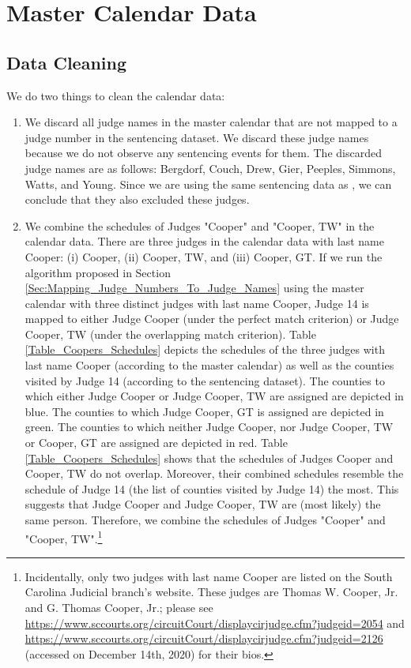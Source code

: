 \documentclass[11pt, oneside]{article}   	%
\theoremstyle{ModifiedStyle}
\begin{document}
\section{Master Calendar Data}
  \label{Appendix:Master_Calendar}
  \subsection{Data Cleaning}
    We do two things to clean the calendar data:

    \begin{enumerate}
      \item We discard all judge names in the master calendar that are not mapped to a judge number in the sentencing dataset. We discard these judge names because we do not observe any sentencing events for them. The discarded judge names are as follows: Bergdorf, Couch, Drew, Gier, Peeples, Simmons, Watts, and Young. Since we are using the same sentencing data as \cite{hester2017conditional}, we can conclude that they also excluded these judges.
    	\item We combine the schedules of Judges "Cooper" and "Cooper, TW" in the calendar data. There are three judges in the calendar data with last name Cooper: (i) Cooper, (ii) Cooper, TW, and (iii) Cooper, GT. If we run the algorithm proposed in Section \ref{Sec:Mapping_Judge_Numbers_To_Judge_Names} using the master calendar with three distinct judges with last name Cooper, Judge 14 is mapped to either Judge Cooper (under the perfect match criterion) or Judge Cooper, TW (under the overlapping match criterion). Table \ref{Table_Coopers_Schedules} depicts the schedules of the three judges with last name Cooper (according to the master calendar) as well as the counties visited by Judge 14 (according to the sentencing dataset). The counties to which either Judge Cooper or Judge Cooper, TW are assigned are depicted in blue. The counties to which Judge Cooper, GT is assigned are depicted in green. The counties to which neither Judge Cooper, nor Judge Cooper, TW or Cooper, GT are assigned are depicted in red. Table \ref{Table_Coopers_Schedules} shows that the schedules of Judges Cooper and Cooper, TW do not overlap. Moreover, their combined schedules resemble the schedule of Judge 14 (the list of counties visited by Judge 14) the most. This suggests that Judge Cooper and Judge Cooper, TW are (most likely) the same person. Therefore, we combine the schedules of Judges "Cooper" and "Cooper, TW".\footnote{Incidentally, only two judges with last name Cooper are listed on the South Carolina Judicial branch's website. These judges are Thomas W. Cooper, Jr. and G. Thomas Cooper, Jr.; please see \url{https://www.sccourts.org/circuitCourt/displaycirjudge.cfm?judgeid=2054} and \url{https://www.sccourts.org/circuitCourt/displaycirjudge.cfm?judgeid=2126} (accessed on December 14th, 2020) for their bios.}
    \end{enumerate}
\end{document}
